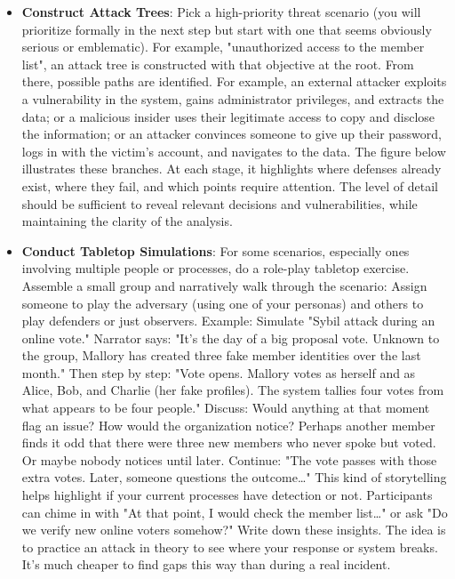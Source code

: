 \begin{itemize}   
    \item \textbf{Construct Attack Trees}: Pick a high-priority threat scenario (you will prioritize
    formally in the next step but start with one that seems obviously serious or emblematic).
    For example, "unauthorized access to the member list", an attack tree is
    constructed with that objective at the root. From there, possible paths are identified.
    For example, an external attacker exploits a vulnerability in the system, gains administrator privileges, and
    extracts the data; or a malicious insider uses their legitimate access to copy
    and disclose the information; or an attacker convinces someone to give up their
    password, logs in with the victim's account, and navigates to the data. The
    figure below illustrates these branches. At each stage, it highlights where
    defenses already exist, where they fail, and which points require attention. The
    level of detail should be sufficient to reveal relevant decisions and
    vulnerabilities, while maintaining the clarity of the analysis.

    \item \textbf{Conduct Tabletop Simulations}: For some scenarios, especially ones involving multiple people or
    processes, do a role-play tabletop exercise. Assemble a small group and narratively walk through the
    scenario: Assign someone to play the adversary (using one of your personas) and others to play
    defenders or just observers. Example: Simulate "Sybil attack during an online vote." Narrator says:
    "It's the day of a big proposal vote. Unknown to the group, Mallory has created three fake member identities over
    the last month." Then step by step: "Vote opens. Mallory votes as herself and as Alice, Bob, and
    Charlie (her fake profiles). The system tallies four votes from what appears to be four people."
    Discuss: Would anything at that moment flag an issue? How would the organization notice? Perhaps another
    member finds it odd that there were three new members who never spoke but voted. Or maybe nobody
    notices until later. Continue: "The vote passes with those extra votes. Later, someone questions the
    outcome…" This kind of storytelling helps highlight if your current processes have detection or not.
    Participants can chime in with "At that point, I would check the member list…" or ask "Do we verify
    new online voters somehow?" Write down these insights. The idea is to practice an attack in theory
    to see where your response or system breaks. It's much cheaper to find gaps this way than during
    a real incident.
    

\end{itemize}
